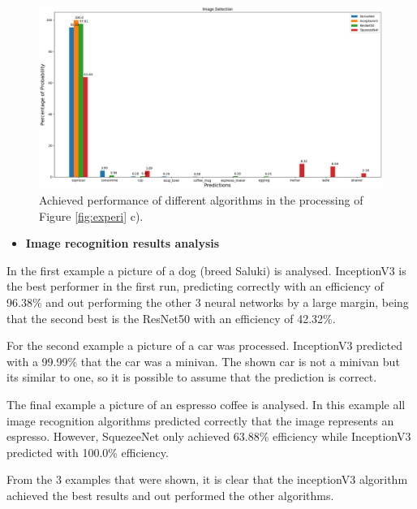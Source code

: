\begin{figure}[H]
  \centering
  \includegraphics[width=\textwidth]{Sections/4InitialWork/4_images/run4_res.png}
  \caption[Achieved performance of different algorithms]{Achieved performance of different algorithms in the processing of Figure \ref{fig:experi} c).}
  \label{fig:exp3}
\end{figure}


\newpage


\begin{itemize}
  \item \textbf{Image recognition results analysis}
\end{itemize}





In the first example a picture of a dog (breed Saluki) is analysed. InceptionV3 is the best performer in the first run, predicting correctly with an efficiency of 96.38\% and out performing the other 3 neural networks by a large margin, being that the second best is the ResNet50 with an efficiency of 42.32\%.

For the second example a picture of a car was processed. InceptionV3 predicted with a 99.99\% that the car was a minivan. The shown car is not a minivan but its similar to one, so it is possible to assume that the prediction is correct.

The final example a picture of an espresso coffee is analysed. In this example all image recognition algorithms predicted correctly that the image represents an espresso. However, SquezeeNet only achieved 63.88\% efficiency while InceptionV3 predicted with 100.0\% efficiency.

From the 3 examples that were shown, it is clear that the inceptionV3 algorithm achieved the best results and out performed the other algorithms.






